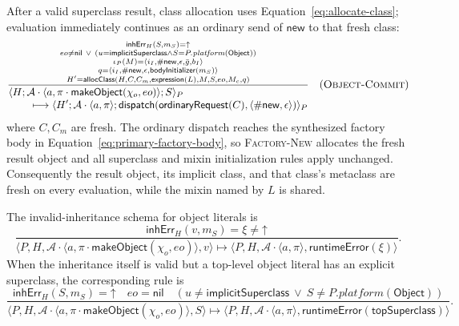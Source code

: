 \documentclass[11pt]{article}
\numberwithin{equation}{section}
\newcommand{\kw}[1]{\ensuremath{\mathsf{#1}}}
\newcommand{\undef}{\mathord{\uparrow}}
\newcommand{\nil}{\kw{nil}}
\newcommand{\rulelabel}[1]{\textsc{#1}}
\begin{document}
After a valid superclass result, class allocation uses
Equation~\eqref{eq:allocate-class}; evaluation immediately continues as an
ordinary send of \kw{new} to that fresh class:
\[
\dfrac{\substack{\mathsf{inhErr}_H(S,m_S)=\undef\\
       eo\ne\nil\ \lor\ (u=\kw{implicitSuperclass}\land
          S=P.\mathit{platform}(\kw{Object}))\\
       \iota_P(M)=\langle i_I,\#\kw{new},\epsilon,\bar g,b_I\rangle\\
       q=\langle i_I,\#\kw{new},\epsilon,\kw{bodyInitializer}(m_S)\rangle\\
       H'=\mathsf{allocClass}(H,C,C_m,\kw{expression}(L),M,S,eo,M_c,q)}}
 {\begin{aligned}
  &\langle H;\mathcal A\cdot\langle a,
       \pi\cdot\kw{makeObject}(\chi_o,eo)\rangle;S\rangle_P\\[-1mm]
  &\qquad\longmapsto
   \langle H';\mathcal A\cdot\langle a,\pi\rangle;
       \kw{dispatch}(\kw{ordinaryRequest}(C),
          \langle\#\kw{new},\epsilon\rangle)\rangle_P
 \end{aligned}}
\quad(\rulelabel{Object-Commit})
\]
where $C,C_m$ are fresh.  The ordinary dispatch reaches the synthesized
factory body in Equation~\eqref{eq:primary-factory-body}, so
\rulelabel{Factory-New} allocates the fresh result object and all superclass
and mixin initialization rules apply unchanged.  Consequently the result
object, its implicit class, and that class's metaclass are fresh on every
evaluation, while the mixin named by $L$ is shared.

The invalid-inheritance schema for object literals is
\begin{equation}\label{eq:object-inheritance-error}
\dfrac{\mathsf{inhErr}_H(v,m_S)=\xi\ne\undef}
 {\langle P,H,\mathcal A\cdot\langle a,
       \pi\cdot\kw{makeObject}(\chi_o,eo)\rangle,v\rangle
  \longmapsto
  \langle P,H,\mathcal A\cdot\langle a,\pi\rangle,
       \kw{runtimeError}(\xi)\rangle}.
\end{equation}
When the inheritance itself is valid but a top-level object literal has an
explicit superclass, the corresponding rule is
\begin{equation}\label{eq:object-top-superclass-error}
\dfrac{\mathsf{inhErr}_H(S,m_S)=\undef\quad eo=\nil\quad
       (u\ne\kw{implicitSuperclass}\ \lor\
        S\ne P.\mathit{platform}(\kw{Object}))}
 {\langle P,H,\mathcal A\cdot\langle a,
       \pi\cdot\kw{makeObject}(\chi_o,eo)\rangle,S\rangle
  \longmapsto
  \langle P,H,\mathcal A\cdot\langle a,\pi\rangle,
       \kw{runtimeError}(\kw{topSuperclass})\rangle}.
\end{equation}
\end{document}
